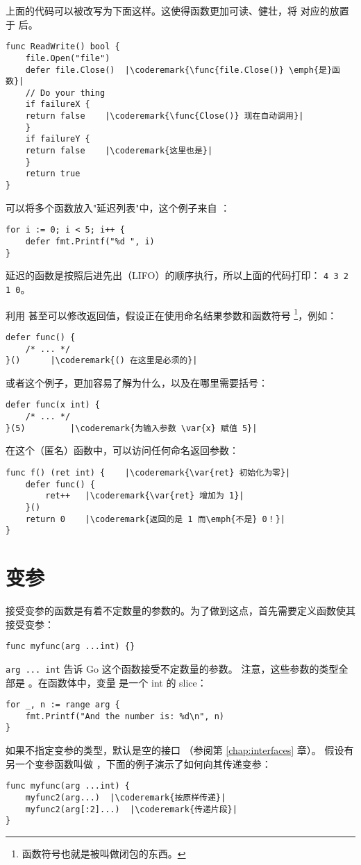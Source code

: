 上面的代码可以被改写为下面这样。这使得函数更加可读、健壮，将
 对应的放置于  后。
\begin{lstlisting}[caption=With defer]
func ReadWrite() bool {
    file.Open("file")
    defer file.Close()	|\coderemark{\func{file.Close()} \emph{是}函数}|
    // Do your thing
    if failureX {
	return false    |\coderemark{\func{Close()} 现在自动调用}|
    }
    if failureY {
	return false    |\coderemark{这里也是}|
    }
    return true
}
\end{lstlisting}

可以将多个函数放入"延迟列表"中，这个例子来自 \cite{effective_go}：
\begin{lstlisting}
for i := 0; i < 5; i++ { 
    defer fmt.Printf("%d ", i) 
} 
\end{lstlisting}
延迟的函数是按照后进先出（LIFO）的顺序执行，所以上面的代码打印：
\lstinline{4 3 2 1 0}。

利用  甚至可以修改返回值，假设正在使用命名结果参数和函数符号
\footnote{函数符号也就是被叫做闭包的东西。}，例如：
\begin{lstlisting}[caption=函数符号]
defer func() {
	/* ... */
}()		 |\coderemark{() 在这里是必须的}|
\end{lstlisting}
或者这个例子，更加容易了解为什么，以及在哪里需要括号：
\begin{lstlisting}[caption=带参数的函数符号]
defer func(x int) {
	/* ... */
}(5)		 |\coderemark{为输入参数 \var{x} 赋值 5}|
\end{lstlisting}
在这个（匿名）函数中，可以访问任何命名返回参数：
\begin{lstlisting}[caption=在 defer 中访问返回值]
func f() (ret int) {    |\coderemark{\var{ret} 初始化为零}|
	defer func() {
		ret++	|\coderemark{\var{ret} 增加为 1}|
	}()
	return 0	|\coderemark{返回的是 1 而\emph{不是} 0！}|
}
\end{lstlisting}

\section{变参}
接受变参的函数是有着不定数量的参数的。为了做到这点，首先需要定义函数使其接受变参：
\begin{lstlisting}
func myfunc(arg ...int) {}
\end{lstlisting}
\lstinline{arg ... int} 告诉 Go 这个函数接受不定数量的参数。
注意，这些参数的类型全部是 。在函数体中，变量
 是一个 int 的 slice：
\begin{lstlisting}
for _, n := range arg {
    fmt.Printf("And the number is: %d\n", n)
}
\end{lstlisting}
如果不指定变参的类型，默认是空的接口  （参阅第 \ref{chap:interfaces} 章）。
假设有另一个变参函数叫做 ，下面的例子演示了如何向其传递变参：
\begin{lstlisting}
func myfunc(arg ...int) {
    myfunc2(arg...)  |\coderemark{按原样传递}|
    myfunc2(arg[:2]...)  |\coderemark{传递片段}|
}
\end{lstlisting}

